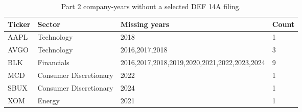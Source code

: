 \begin{table}[htbp]
\centering
\caption{Part 2 company-years without a selected DEF 14A filing.}
\label{tab:missing_company_years}
\begin{tabular}{llll}
\hline
Ticker & Sector & Missing years & Count \\
\hline
AAPL & Technology & 2018 & 1 \\
AVGO & Technology & 2016,2017,2018 & 3 \\
BLK & Financials & 2016,2017,2018,2019,2020,2021,2022,2023,2024 & 9 \\
MCD & Consumer Discretionary & 2022 & 1 \\
SBUX & Consumer Discretionary & 2024 & 1 \\
XOM & Energy & 2021 & 1 \\
\hline
\end{tabular}
\end{table}
